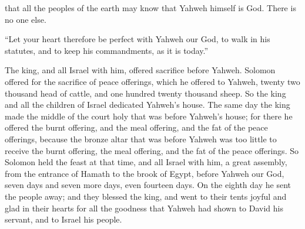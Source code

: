 {that all the peoples of the earth may know that Yahweh himself is God. There is no one else.
\par }{\PP {}“Let your heart therefore be perfect with Yahweh our God, to walk in his statutes, and to keep his commandments, as it is today.”
\par }{\PP {}The king, and all Israel with him, offered sacrifice before Yahweh.
Solomon offered for the sacrifice of peace offerings, which he offered to Yahweh, twenty two thousand head of cattle, and one hundred twenty thousand sheep. So the king and all the children of Israel dedicated Yahweh’s house.
The same day the king made the middle of the court holy that was before Yahweh’s house; for there he offered the burnt offering, and the meal offering, and the fat of the peace offerings, because the bronze altar that was before Yahweh was too little to receive the burnt offering, the meal offering, and the fat of the peace offerings.
So Solomon held the feast at that time, and all Israel with him, a great assembly, from the entrance of Hamath to the brook of Egypt, before Yahweh our God, seven days and seven more days, even fourteen days.
On the eighth day he sent the people away; and they blessed the king, and went to their tents joyful and glad in their hearts for all the goodness that Yahweh had shown to David his servant, and to Israel his people.

}
